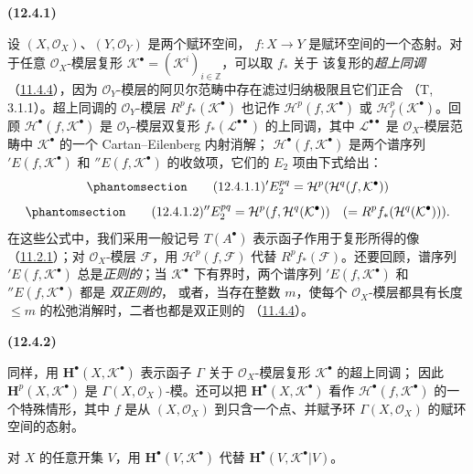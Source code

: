 \documentclass[UTF8,fontset=none,11pt,oneside,openany]{ctexbook}
\newenvironment{env}[1][]{%
  \par\medskip\noindent\textbf{(#1)}\ %
}{\par}
\newcommand{\oldpage}[2][]{%
  \hypertarget{ega-source-page-#1-#2}{}%
  \marginnote{\scriptsize\textbf{#1}~|~#2}\ignorespaces}
\let\EGAOriginalLabel\label
\renewcommand{\label}[1]{\phantomsection\EGAOriginalLabel{#1}}
\begin{document}
\begin{env}[12.4.1]
\label{0.12.4.1-fr}
设 $(X,\mathcal O_X)$、$(Y,\mathcal O_Y)$ 是两个赋环空间，
$f:X\to Y$ 是赋环空间的一个态射。对于任意
$\mathcal O_X$-模层复形
$\mathcal K^\bullet=(\mathcal K^i)_{i\in\mathbb Z}$，可以取 $f_*$ 关于
该复形的\emph{超上同调}（\hyperref[0.11.4.4-fr]{11.4.4}），因为
$\mathcal O_Y$-模层的阿贝尔范畴中存在滤过归纳极限且它们正合
（T, 3.1.1）。超上同调的 $\mathcal O_Y$-模层
$R^p f_*(\mathcal K^\bullet)$ 也记作
$\mathcal H^p(f,\mathcal K^\bullet)$ 或
$\mathcal H_f^p(\mathcal K^\bullet)$。回顾
$\mathcal H^\bullet(f,\mathcal K^\bullet)$ 是 $\mathcal O_Y$-模层双复形
$f_*(\mathcal L^{\bullet\bullet})$ 的上同调，其中
$\mathcal L^{\bullet\bullet}$ 是 $\mathcal O_X$-模层范畴中
$\mathcal K^\bullet$ 的一个 Cartan--Eilenberg 内射消解；
$\mathcal H^\bullet(f,\mathcal K^\bullet)$ 是两个谱序列
${}'E(f,\mathcal K^\bullet)$ 和 ${}''E(f,\mathcal K^\bullet)$
的收敛项，它们的 $E_2$ 项由下式给出：
\begin{equation}
\label{0.12.4.1.1-fr}
\tag{12.4.1.1}
{}'E_2^{pq}=\mathcal H^p(\mathcal H^q(f,\mathcal K^\bullet))
\end{equation}
\begin{equation}
\label{0.12.4.1.2-fr}
\tag{12.4.1.2}
{}''E_2^{pq}=\mathcal H^p(f,\mathcal H^q(\mathcal K^\bullet))
\quad(=R^p f_*(\mathcal H^q(\mathcal K^\bullet))).
\end{equation}
在这些公式中，我们采用一般记号 $T(A^\bullet)$ 表示函子作用于复形所得的像
（\hyperref[0.11.2.1-fr]{11.2.1}）；对 $\mathcal O_X$-模层
$\mathcal F$，用 $\mathcal H^p(f,\mathcal F)$ 代替
$R^p f_*(\mathcal F)$。还要回顾，谱序列
${}'E(f,\mathcal K^\bullet)$ 总是\emph{正则的}；当
$\mathcal K^\bullet$ 下有界时，两个谱序列
${}'E(f,\mathcal K^\bullet)$ 和 ${}''E(f,\mathcal K^\bullet)$ 都是
\emph{双正则的}，
\oldpage[0\textsubscript{III}]{63}
或者，当存在整数 $m$，使每个 $\mathcal O_X$-模层都具有长度
$\leq m$ 的松弛消解时，二者也都是双正则的
（\hyperref[0.11.4.4-fr]{11.4.4}）。
\end{env}

\begin{env}[12.4.2]
\label{0.12.4.2-fr}
同样，用 $\mathbf H^\bullet(X,\mathcal K^\bullet)$ 表示函子
$\Gamma$ 关于 $\mathcal O_X$-模层复形 $\mathcal K^\bullet$ 的超上同调；
因此 $\mathbf H^p(X,\mathcal K^\bullet)$ 是
$\Gamma(X,\mathcal O_X)$-模。还可以把
$\mathbf H^\bullet(X,\mathcal K^\bullet)$ 看作
$\mathcal H^\bullet(f,\mathcal K^\bullet)$ 的一个特殊情形，其中 $f$ 是从
$(X,\mathcal O_X)$ 到只含一个点、并赋予环
$\Gamma(X,\mathcal O_X)$ 的赋环空间的态射。

对 $X$ 的任意开集 $V$，用
$\mathbf H^\bullet(V,\mathcal K^\bullet)$ 代替
$\mathbf H^\bullet(V,\mathcal K^\bullet|V)$。
\end{env}
\end{document}
